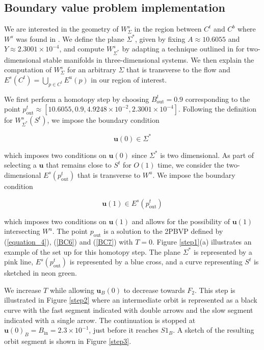 \documentclass{ws-ijbc}
\begin{document}
\subsection{Boundary value problem implementation}
    
We are interested in the geometry of $W^{s}_{\Sigma}$ in the region between $C^t$ and $C^b$ where $W^s$ was found in \cite{QSSA}.  We define the plane $\Sigma^*$, given by fixing $A\approx10.6055$ and $Y\approx2.3001 \times 10^{-4}$, and compute $W^{s}_{\Sigma^*}$ by adapting a technique outlined in \cite{Saeed_Paper} for two-dimensional stable manifolds in three-dimensional systems.  We then explain the computation of $W^{s}_{\Sigma}$ for an arbitrary $\Sigma$ that is transverse to the flow and $E^s(C^t)=\bigcup_{p \in C^t} E^u(p)$ in our region of interest.
    
We first perform a homotopy step by choosing $B^t_{\mathrm{out}} = 0.9$ corresponding to the point $p^t_{\text{out}}\approx[10.6055, 0.9, 4.9248 \times 10^{-2}, 2.3001 \times 10^{-4}]$.  Following the definition for $W^s_{\Sigma^*}(S^t)$, we impose the boundary condition
    
\begin{equation}
\mathbf{u}(0) \in \Sigma^*
\label{BC6}
\end{equation}
    
 \noindent
 which imposes two conditions on $\mathbf{u}(0)$ since $\Sigma^*$ is two dimensional.  As part of selecting a $\mathbf{u}$ that remains close to $S^t$ for $O(1)$ time, we consider the two-dimensional $E^s(p^t_{\text{out}})$ that is transverse to $W^u$.  We impose the boundary condition
    
\begin{equation}
\mathbf{u}(1) \in E^s(p^t_{\text{out}})
\label{BC7}
\end{equation}
    
\noindent
which imposes two conditions on $\mathbf{u}(1)$ and allows for the possibility of $\mathbf{u}(1)$ intersecting $W^u$.  The point $p_{\text{out}}$ is a solution to the 2PBVP defined by (\ref{equation_4}), (\ref{BC6}) and (\ref{BC7}) with $T=0$.  Figure \ref{step1}(a) illustrates an example of the set up for this homotopy step.  The plane $\Sigma^*$ is represented by a pink line, $E^s(p^t_{\mathrm{out}})$ is represented by a blue cross, and a curve representing $S^t$ is sketched in neon green.
    
We increase $T$ while allowing $\mathbf{u}_{B}(0)$ to decrease towards $F_2$.  This step is illustrated in Figure \ref{step2} where an intermediate orbit is represented as a black curve with the fast segment indicated with double arrows and the slow segment indicated with a single arrow.  The continuation is stopped at $\mathbf{u}(0)_B = B_{\text{in}}=2.3 \times 10^{-1}$, just before it reaches $S1_B$.  A sketch of the resulting orbit segment is shown in Figure \ref{step3}.
    
\end{document}
